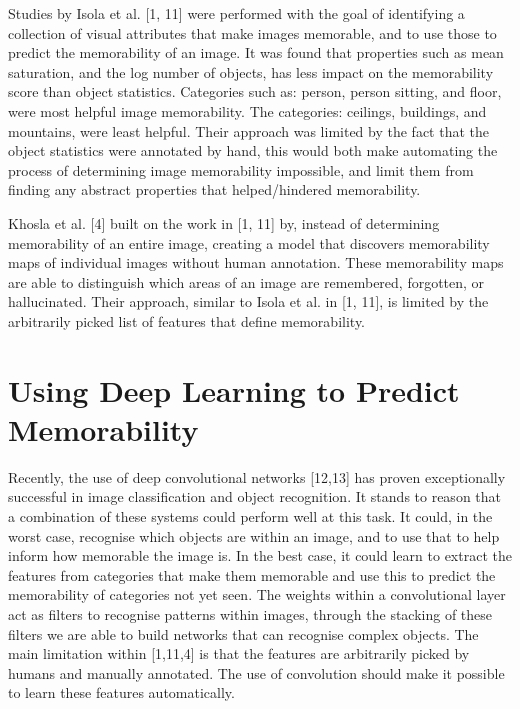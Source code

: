 \documentclass{UoYCSproject}
\begin{document}
Studies by Isola et al. [1, 11] were performed with the goal of identifying a collection of visual attributes that make images memorable, and to use those to predict the memorability of an image. It was found that properties such as mean saturation, and the log number of objects, has less impact on the memorability score than object statistics. 
Categories such as: person, person sitting, and floor, were most helpful image memorability. The categories: ceilings, buildings, and mountains, were least helpful. Their approach was limited by the fact that the object statistics were annotated by hand, this would both make automating the process of determining image memorability impossible, and limit them from finding any abstract properties that helped/hindered memorability.

Khosla et al. [4] built on the work in [1, 11] by, instead of determining memorability of an entire image, creating a model that discovers memorability maps of individual images without human annotation. These memorability maps are able to distinguish which areas of an image are remembered, forgotten, or hallucinated. Their approach, similar to Isola et al. in [1, 11], is limited by the arbitrarily picked list of features that define memorability.

\section{Using Deep Learning to Predict Memorability}

Recently, the use of deep convolutional networks [12,13] has proven exceptionally successful in image classification and object recognition. It stands to reason that a combination of these systems could perform well at this task. It could, in the worst case, recognise which objects are within an image, and to use that to help inform how memorable the image is. In the best case, it could learn to extract the features from categories that make them memorable and use this to predict the memorability of categories not yet seen. The weights within a convolutional layer act as filters to recognise patterns within images, through the stacking of these filters we are able to build networks that can recognise complex objects. The main limitation within [1,11,4] is that the features are arbitrarily picked by humans and manually annotated. The use of convolution should make it possible to learn these features automatically.   
\end{document}
